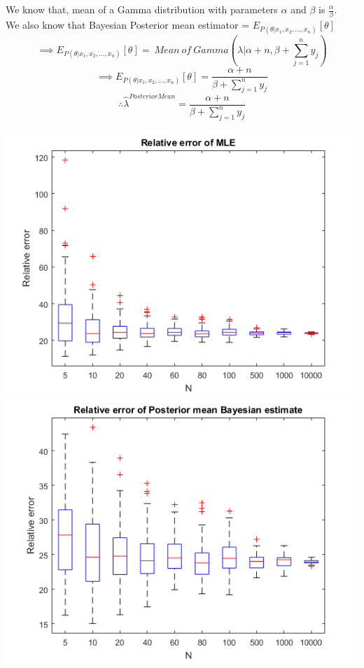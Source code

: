 \documentclass{article}
\begin{document}
\begin{enumerate}
	We know that, mean of a Gamma distribution with parameters $\alpha$ and $\beta$ is $\frac{\alpha}{\beta}$. \\
	We also know that Bayesian Posterior mean estimator = $E_{P(\theta | x_1,x_2,...,x_n)} [\theta]$
	$$\implies E_{P(\theta | x_1,x_2,...,x_n)} [\theta] = \ Mean \ of \ Gamma(\lambda | \alpha + n, \beta + \sum_{j=1}^{n} y_j)$$
	$$\implies E_{P(\theta | x_1,x_2,...,x_n)} [\theta] = \frac{\alpha + n}{\beta + \sum_{j=1}^{n} y_j}$$
	$$ \therefore \hat{\lambda}^{PosteriorMean} = \frac{\alpha + n}{\beta + \sum_{j=1}^{n} y_j}$$
	\begin{center}
		\includegraphics[scale=0.8]{p2_mle} \\
		\includegraphics[scale=0.8]{p2_bpme} \\

\end{center}
\end{enumerate}
\end{document}

